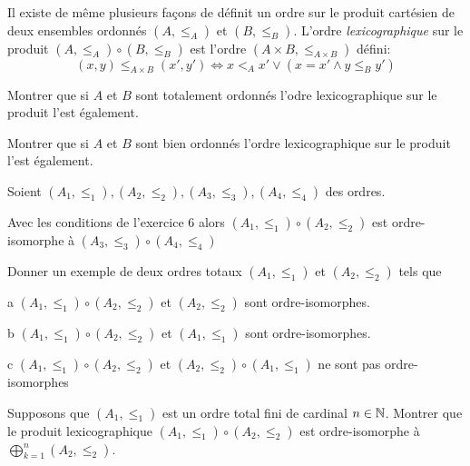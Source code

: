 \documentclass[french]{report}
\begin{document}
\begin{exo}
    Il existe de même plusieurs façons de définit un ordre sur le produit cartésien
    de deux ensembles ordonnés \(\left(A,\leq_A\right)\) et \(\left(B,\leq_B\right)\).
    L'ordre \textit{lexicographique} sur le produit \(\left(A,\leq_A\right)\circ
    \left(B,\leq_B\right)\) est l'ordre \(\left(A\times B,\leq_{A\times B}\right)\) défini:
    \[(x,y)\leq_{A\times B}(x',y')\Leftrightarrow x<_Ax'\lor\left(x=x'\land y\leq_B y'\right)\]
    \begin{q}{1}
        Montrer que si \(A\) et \(B\) sont totalement ordonnés l'odre lexicographique
        sur le produit l'est également.
    \end{q}
    \begin{q}{2}
        Montrer que si \(A\) et \(B\) sont bien ordonnés l'ordre lexicographique
        sur le produit l'est également.
    \end{q}
\end{exo}

\begin{exo}
    Soient \(\left(A_1,\leq_1\right),\left(A_2,\leq_2\right),\left(A_3,\leq_3\right),
    \left(A_4,\leq_4\right)\) des ordres.
    \begin{q}{1}
        Avec les conditions de l'exercice 6 alors
        \(\left(A_1,\leq_1\right)\circ\left(A_2,\leq_2\right)\) est ordre-isomorphe
        à \(\left(A_3,\leq_3\right)\circ\left(A_4,\leq_4\right)\)
    \end{q}
    \begin{q}{2}
        Donner un exemple de deux ordres totaux \(\left(A_1,\leq_1\right)\)
        et \(\left(A_2,\leq_2\right)\) tels que
        \begin{q}{a}
            \(\left(A_1,\leq_1\right)\circ\left(A_2,\leq_2\right)\) et
            \(\left(A_2,\leq_2\right)\) sont ordre-isomorphes.
        \end{q}
        \begin{q}{b}
            \(\left(A_1,\leq_1\right)\circ\left(A_2,\leq_2\right)\) et
            \(\left(A_1,\leq_1\right)\) sont ordre-isomorphes.
        \end{q}
        \begin{q}{c}
            \(\left(A_1,\leq_1\right)\circ\left(A_2,\leq_2\right)\) et
            \(\left(A_2,\leq_2\right)\circ\left(A_1,\leq_1\right)\) ne sont pas
            ordre-isomorphes
        \end{q}
    \end{q}
    \begin{q}{3}
        Supposons que \(\left(A_1,\leq_1\right)\) est un ordre total fini de cardinal
        \(n\in\mathbb{N}\). Montrer que le produit lexicographique
        \(\left(A_1,\leq_1\right)\circ\left(A_2,\leq_2\right)\) est ordre-isomorphe
        à \(\bigoplus_{k=1}^n \left(A_2,\leq_2\right)\).
    \end{q}
\end{exo}
\end{document}

